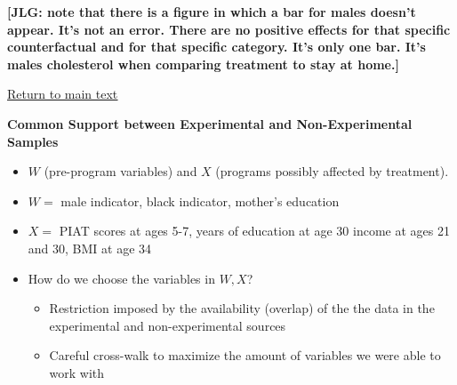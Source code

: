 \documentclass[static]{JJH-Beamer}
\begin{document}
\textbf{[JLG: note that there is a figure in which a bar for males doesn't appear. It's not an error. There are no positive effects for that specific counterfactual and for that specific category. It's only one bar. It's males cholesterol when comparing treatment to stay at home.]}

\begin{frame}

\begin{center}
\hyperlink{ret:estimated-comb}{\underline{Return to main text}}
\end{center}

\end{frame}

{}
\begin{frame}

\hypertarget{doughnut}{}
\begin{center}
\textbf{Common Support between Experimental and Non-Experimental Samples}
\end{center}

\end{frame}

\begin{frame}

\begin{itemize}
\item $W$ (pre-program variables) and $X$ (programs possibly affected by treatment).
\item $W =$ {male indicator, black indicator, mother’s education}
\item $X =$ {PIAT scores at ages 5-7, years of education at age 30 income at ages 21 and 30, BMI at age 34}
\item How do we choose the variables in $W,X$?
    \begin{itemize}
    \item Restriction imposed by the availability (overlap) of the the data in the experimental and non-experimental sources
    \item Careful cross-walk to maximize the amount of variables we were able to work with
    \end{itemize}
\end{itemize}

\end{frame}
\end{document}
